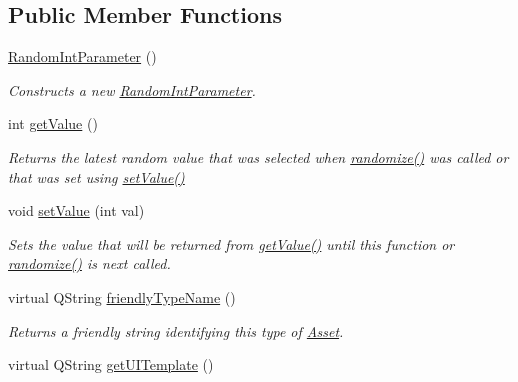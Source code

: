 \subsection*{Public Member Functions}
\begin{DoxyCompactItemize}
\item 
\hyperlink{class_picto_1_1_random_int_parameter_ad6bc9911b695920d0d4a1a23eb9dfd0d}{Random\-Int\-Parameter} ()
\begin{DoxyCompactList}\small\item\em Constructs a new \hyperlink{class_picto_1_1_random_int_parameter}{Random\-Int\-Parameter}. \end{DoxyCompactList}\item 
\hypertarget{class_picto_1_1_random_int_parameter_a7cec0e0ed11f2cb239bad7e88ff2071b}{int \hyperlink{class_picto_1_1_random_int_parameter_a7cec0e0ed11f2cb239bad7e88ff2071b}{get\-Value} ()}\label{class_picto_1_1_random_int_parameter_a7cec0e0ed11f2cb239bad7e88ff2071b}

\begin{DoxyCompactList}\small\item\em Returns the latest random value that was selected when \hyperlink{class_picto_1_1_random_int_parameter_a2995dcbd9542ebeb1e880c573125a962}{randomize()} was called or that was set using \hyperlink{class_picto_1_1_random_int_parameter_a7da6e2221ce0490589d76b91f9e26ffc}{set\-Value()} \end{DoxyCompactList}\item 
\hypertarget{class_picto_1_1_random_int_parameter_a7da6e2221ce0490589d76b91f9e26ffc}{void \hyperlink{class_picto_1_1_random_int_parameter_a7da6e2221ce0490589d76b91f9e26ffc}{set\-Value} (int val)}\label{class_picto_1_1_random_int_parameter_a7da6e2221ce0490589d76b91f9e26ffc}

\begin{DoxyCompactList}\small\item\em Sets the value that will be returned from \hyperlink{class_picto_1_1_random_int_parameter_a7cec0e0ed11f2cb239bad7e88ff2071b}{get\-Value()} until this function or \hyperlink{class_picto_1_1_random_int_parameter_a2995dcbd9542ebeb1e880c573125a962}{randomize()} is next called. \end{DoxyCompactList}\item 
virtual Q\-String \hyperlink{class_picto_1_1_random_int_parameter_a2b1e77e3555630fb0186741893327681}{friendly\-Type\-Name} ()
\begin{DoxyCompactList}\small\item\em Returns a friendly string identifying this type of \hyperlink{class_picto_1_1_asset}{Asset}. \end{DoxyCompactList}\item 
\hypertarget{class_picto_1_1_random_int_parameter_adf7101a7199bcfe8b69b67adb33d11ac}{virtual Q\-String \hyperlink{class_picto_1_1_random_int_parameter_adf7101a7199bcfe8b69b67adb33d11ac}{get\-U\-I\-Template} ()}\label{class_picto_1_1_random_int_parameter_adf7101a7199bcfe8b69b67adb33d11ac}


\end{DoxyCompactItemize}
